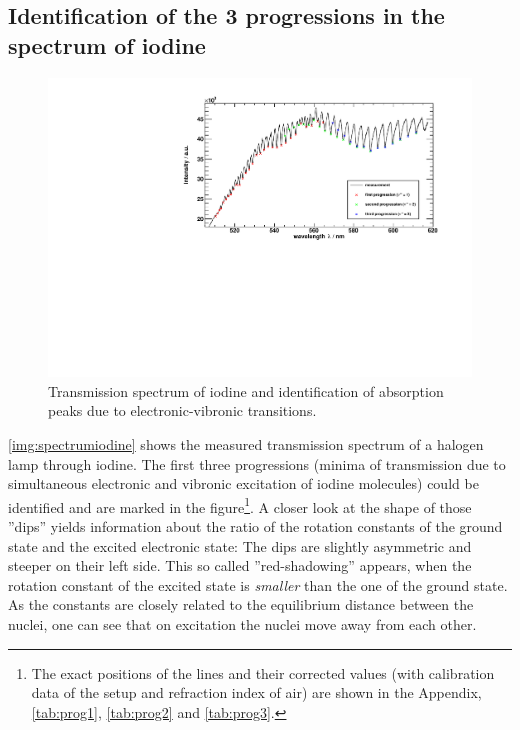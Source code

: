 \subsection{Identification of the 3 progressions in the spectrum of iodine}

\begin{figure}[H]
\begin{center}
  \includegraphics[width=\textwidth]{../img/I2_absorption.pdf}
  \caption[---]{Transmission spectrum of iodine and identification of absorption peaks due
  to electronic-vibronic transitions.}
  \label{img:spectrumiodine}
\end{center}
\end{figure}

\autoref{img:spectrumiodine} shows the measured transmission spectrum of a halogen lamp through iodine.
The first three progressions
(minima of transmission due to simultaneous electronic and vibronic excitation of iodine molecules)
could be identified and are marked in the
figure\footnote{The exact positions of the lines and
their corrected values (with calibration data of the setup and refraction index of air)
are shown in the Appendix, \autoref{tab:prog1}, \autoref{tab:prog2} and \autoref{tab:prog3}.}.
A closer look at the shape of those ''dips'' yields information about the ratio of the rotation constants
of the ground state and the excited electronic state:
The dips are slightly asymmetric and steeper on their left side. This so called
''red-shadowing'' appears, when the rotation constant of the excited state is \emph{smaller} than
the one of the ground state. As the constants are closely related to the equilibrium distance between the nuclei,
one can see that on excitation the nuclei move away from each other.

